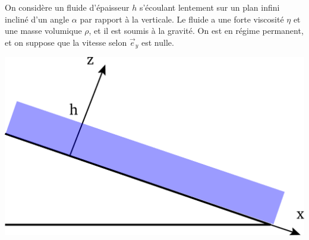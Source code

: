 \documentclass{report}
\begin{document}
On considère un fluide d'épaisseur $h$ s'écoulant lentement sur un plan infini incliné d'un angle $\alpha$ par rapport à la verticale. Le fluide a une forte viscosité $\eta$ et une masse volumique $\rho$, et il est soumis à la gravité. On est en régime permanent, et on suppose que la vitesse selon $\vec{e}_y$ est nulle.

\begin{center}
	\includegraphics[scale=0.3]{ecoulement.pdf}
\end{center}
\end{document}
